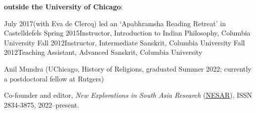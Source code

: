 \documentclass{scrartcl}
\begin{document}
\textbf{outside the University of Chicago}:

\begin{entrylist}
\singleentry
{July 2017}{(with Eva de Clercq) led an ‘Apabhramsha Reading Retreat’ in Castelldefels}
\singleentry
{Spring 2015}{Instructor, Introduction to Indian Philosophy, Columbia University}
\singleentry
{Fall 2012}{Instructor, Intermediate Sanskrit, Columbia University}
\singleentry
{Fall 2012}{Teaching Assistant, Advanced Sanskrit, Columbia University}
\end{entrylist} 


Anil Mundra (UChicago, History of Religions, graduated Summer 2022; currently a postdoctoral fellow at Rutgers)\bigskip


Co-founder and editor, \emph{New Explorations in South Asia Research} (\href{https://nesarjournal.org}{NESAR}), ISSN 2834-3875, 2022–present.\smallskip

\vfill
\end{document}
